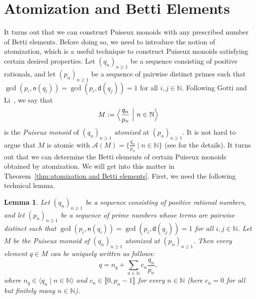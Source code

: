 \documentclass[12pt]{amsart}
\newtheorem{lemma}[theorem]{Lemma}
\theoremstyle{definition}
\numberwithin{equation}{section}
\newcommand{\nn}{\mathbb{N}}
\providecommand\ldb{\llbracket}
\providecommand\rdb{\rrbracket}
\begin{document}
\section{Atomization and Betti Elements}
\label{sec:atomization}

It turns out that we can construct Puiseux monoids with any prescribed number of Betti elements. Before doing so, we need to introduce the notion of atomization, which is a useful technique to construct Puiseux monoids satisfying certain desired properties. Let $(q_n)_{n \ge 1}$ be a sequence consisting of positive rationals, and let $(p_n)_{n \ge 1}$ be a sequence of pairwise distinct primes such that $\gcd(p_i, \mathsf{n}(q_i)) = \gcd(p_i, \mathsf{d}(q_j)) = 1$ for all $i,j \in \nn$. Following Gotti and Li~\cite{GL23}, we say that
\[
	M := \Big\langle \frac{q_n}{p_n} \ \Big{|} \ n \in \nn \Big\rangle
\]
is the \emph{Puiseux monoid} of $(q_n)_{n \ge 1}$ \emph{atomized} at $(p_n)_{n \ge 1}$. It is not hard to argue that $M$ is atomic with $\mathcal{A}(M) = \big\{ \frac{q_n}{p_n} \mid n \in \nn \big\}$ (see \cite[Proposition~3.1]{GL23} for the details). It turns out that we can determine the Betti elements of certain Puiseux monoids obtained by atomization. We will get into this matter in Theorem~\ref{thm:atomization and Betti elements}. First, we need the following technical lemma.

\begin{lemma} \label{lem:canonical decomposition of atomized PMs}
	Let $(q_n)_{n \ge 1}$ be a sequence consisting of positive rational numbers, and let $(p_n)_{n \ge 1}$ be a sequence of prime numbers whose terms are pairwise distinct such that $\gcd(p_i, \mathsf{n}(q_i)) = \gcd(p_i, \mathsf{d}(q_j)) = 1$ for all $i,j \in \nn$. Let $M$ be the Puiseux monoid of $(q_n)_{n \ge 1}$ atomized at $(p_n)_{n \ge 1}$. Then every element $q \in M$ can be uniquely written as follows:
	\begin{equation} \label{eq:canonical decomposition}
		q = n_q + \sum_{n \in \nn} c_n \frac{q_n}{p_n},
	\end{equation}
	where $n_q \in \langle q_n \mid n \in \nn \rangle$ and $c_n \in \ldb 0, p_n - 1 \rdb$ for every $n \in \nn$ (here $c_n = 0$ for all but finitely many $n \in \nn$).
\end{lemma}
\end{document}
